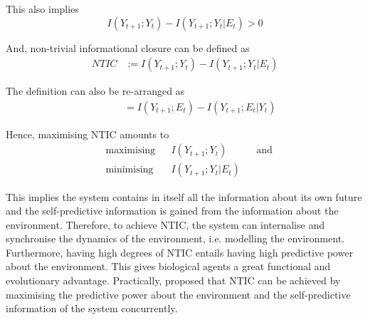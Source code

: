 \documentclass[utf8]{article}
\begin{document}
			\noindent
			This also implies
				\begin{equation}
					I(Y_{t+1};Y_{t})-I(Y_{t+1};Y_{t}|E_{t}) > 0
				\end{equation}



			\noindent
			And, non-trivial informational closure can be defined as
				\begin{equation}
				\label{eq:NTIC}
    				\left.\begin{array}
    				{rl}{NTIC} & {:=I(Y_{t+1};Y_{t})-I(Y_{t+1};Y_{t}|E_{t})}
    				\end{array} \right.
				\end{equation}
				
				
			\noindent
            The definition can also be re-arranged as 
				\begin{equation}
				\label{eq:NTIC2}
    				\left.\begin{array}
    				{rl}{\qquad} & {\ =I(Y_{t+1};E_{t})-I(Y_{t+1};E_{t}|Y_{t})}
    				\end{array} \right.
				\end{equation}				

			\noindent
			Hence, maximising NTIC amounts to
				\begin{equation}
    				\label{eq:nticObjective}
    				\begin{aligned}
    				& \text{maximising} & { } & I(Y_{t+1};Y_{t}) & { } & \text{and} \\
    				& \text{minimising} & { } & I(Y_{t+1};Y_{t}|E_{t}) & { }
    				\end{aligned}
				\end{equation}

			\noindent
			This implies the system contains in itself all the information about its own future and the self-predictive information is gained from the information about the environment. Therefore, to achieve NTIC, the system can internalise and synchronise the dynamics of the environment, i.e. modelling the environment. Furthermore, having high degrees of NTIC entails having high predictive power about the environment. This gives biological agents a great functional and evolutionary advantage. Practically, \cite{guttenberg2016neural} proposed that NTIC can be achieved by maximising the predictive power about the environment and the self-predictive information of the system concurrently.
\end{document}
